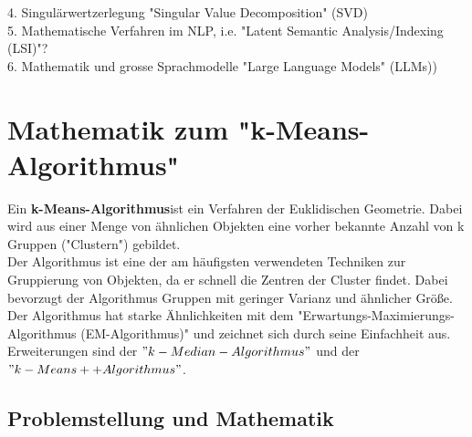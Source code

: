 \documentclass[12pt]{article}
\begin{document}
4. Singulärwertzerlegung "Singular Value Decomposition" (SVD)\\
 
5. Mathematische Verfahren im NLP, i.e. "Latent Semantic Analysis/Indexing (LSI)"?\\

6. Mathematik und grosse Sprachmodelle "Large Language Models" (LLMs))

\newpage

\section{Mathematik zum "k-Means-Algorithmus" \\}

Ein \textbf{k-Means-Algorithmus}ist ein Verfahren der Euklidischen Geometrie. Dabei wird aus einer Menge von ähnlichen Objekten eine vorher bekannte Anzahl von k Gruppen ("Clustern") gebildet.\\
Der Algorithmus ist eine der am häufigsten verwendeten Techniken zur Gruppierung von Objekten, da er schnell die Zentren der Cluster findet. Dabei bevorzugt der Algorithmus Gruppen mit geringer Varianz und ähnlicher Größe.\\
Der Algorithmus hat starke Ähnlichkeiten mit dem "Erwartungs-Maximierungs-Algorithmus (EM-Algorithmus)" und zeichnet sich durch seine Einfachheit aus.\\
Erweiterungen sind der $"k-Median-Algorithmus"$ und der $"k-Means++ Algorithmus" $.\\

\subsection{Problemstellung und Mathematik}
\end{document}
